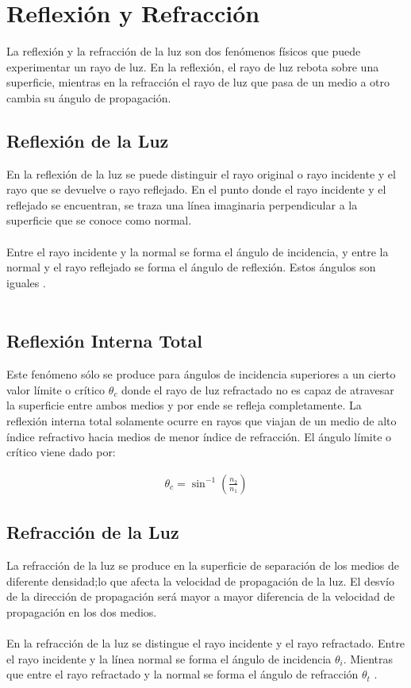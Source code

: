 \documentclass[
aps,
reprint,
amsmath, amssymb,
superscriptaddress,
]{revtex4-2}
\begin{document}
\section{Reflexión y Refracción}
La reflexión y la refracción de la luz son dos fenómenos físicos que puede experimentar un rayo de luz. En la reflexión, el rayo de luz rebota sobre una superficie, mientras en la refracción el rayo de luz que pasa de un medio a otro cambia su ángulo de propagación.

\subsection{Reflexión de la Luz}

En la reflexión de la luz se puede distinguir el rayo original o rayo incidente y el rayo que se devuelve o rayo reflejado. En el punto donde el rayo incidente y el reflejado se encuentran, se traza una línea imaginaria perpendicular a la superficie que se conoce como normal.\\
\\
Entre el rayo incidente y la normal se forma el ángulo de incidencia, y entre la normal y el rayo reflejado se forma el ángulo de reflexión. Estos ángulos son iguales \cite{optics}.\\
\\
\subsection{Reflexión Interna Total}

Este fenómeno sólo se produce para ángulos de incidencia superiores a un cierto valor límite o crítico $\theta_c$ donde el rayo de luz refractado no es capaz de atravesar la superficie entre ambos medios y por ende se refleja completamente. La reflexión interna total solamente ocurre en rayos que viajan de un medio de alto índice refractivo hacia medios de menor índice de refracción. El ángulo límite o crítico viene dado por: 

\begin{align*}
    \theta_{c} = \sin^{-1}\left(\frac{n_{2}}{n_{1}}\right)
\end{align*}


\subsection{Refracción de la Luz}

La refracción de la luz se produce en la superficie de separación de los medios de diferente densidad;lo que afecta la velocidad de propagación de la luz. El desvío de la dirección de propagación será mayor a mayor diferencia de la velocidad de propagación en los dos medios.\\
\\
En la refracción de la luz se distingue el rayo incidente y el rayo refractado. Entre el rayo incidente y la línea normal se forma el ángulo de incidencia $\theta_i$. Mientras que entre el rayo refractado y la normal se forma el ángulo de refracción $\theta_t$ \cite{optics}.\\
\end{document}
